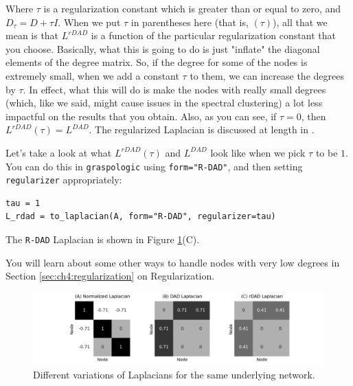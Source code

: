 Where $\tau$ is a regularization constant which is greater than or equal to zero, and $D_\tau = D + \tau I$. When we put $\tau$ in parentheses here (that is, $(\tau)$), all that we mean is that $L^{rDAD}$ is a function of the particular regularization constant that you choose. Basically, what this is going to do is just "inflate" the diagonal elements of the degree matrix. So, if the degree for some of the nodes is extremely small, when we add a constant $\tau$ to them, we can increase the degrees by $\tau$. In effect, what this will do is make the nodes with really small degrees (which, like we said, might cause issues in the spectral clustering) a lot less impactful on the results that you obtain. Also, as you can see, if $\tau = 0$, then $L^{rDAD}(\tau) = L^{DAD}$. The regularized Laplacian is discussed at length in \cite{Qin2013Sep}.

Let's take a look at what $L^{rDAD}(\tau)$ and $L^{DAD}$ look like when we pick $\tau$ to be $1$. You can do this in \texttt{graspologic} using \texttt{form="R-DAD"}, and then setting \texttt{regularizer} appropriately:
\begin{lstlisting}[style=python]
tau = 1
L_rdad = to_laplacian(A, form="R-DAD", regularizer=tau)
\end{lstlisting}
The \texttt{R-DAD} Laplacian is shown in Figure \ref{fig:ch4:normlapl}(C).

You will learn about some other ways to handle nodes with very low degrees in Section \ref{sec:ch4:regularization} on Regularization.

\begin{figure}[h]
    \centering
    \includegraphics[width=\linewidth]{representations/ch4/Images/normlapls.png}
    \caption[comparison of normalized Laplacians]{Different variations of Laplacians for the same underlying network.}
    \label{fig:ch4:normlapl}
\end{figure}

\newpage